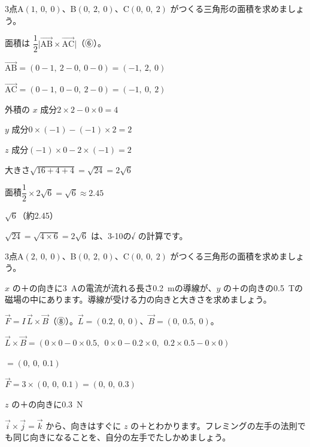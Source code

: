 \begin{reidai}[外積で三角形の面積を求める]
3点A$(1,\ 0,\ 0)$、B$(0,\ 2,\ 0)$、C$(0,\ 0,\ 2)$ がつくる三角形の面積を求めましょう。\par
\kangaekata 面積は $\dfrac{1}{2}\bigl|\overrightarrow{\mathrm{AB}}\times\overrightarrow{\mathrm{AC}}\bigr|$（⑥）。\par
\shiki $\overrightarrow{\mathrm{AB}}=(0-1,\ 2-0,\ 0-0)=(-1,\ 2,\ 0)$\par
\hspace*{2.6\zw}$\overrightarrow{\mathrm{AC}}=(0-1,\ 0-0,\ 2-0)=(-1,\ 0,\ 2)$\par
\hspace*{2.6\zw}外積の $x$ 成分\enspace $2\times2-0\times0=4$\par
\hspace*{2.6\zw}$y$ 成分\enspace $0\times(-1)-(-1)\times2=2$\par
\hspace*{2.6\zw}$z$ 成分\enspace $(-1)\times0-2\times(-1)=2$\par
\hspace*{2.6\zw}大きさ\enspace $\sqrt{16+4+4}=\sqrt{24}=2\sqrt6$\par
\hspace*{2.6\zw}面積\enspace $\dfrac{1}{2}\times2\sqrt6=\sqrt6\approx2.45$\par
\kotae $\sqrt6$（約2.45）
\end{reidai}
$\sqrt{24}=\sqrt{4\times6}=2\sqrt6$ は、3-10の√ の計算です。

\begin{jibun}
3点A$(2,\ 0,\ 0)$、B$(0,\ 2,\ 0)$、C$(0,\ 0,\ 2)$ がつくる三角形の面積を求めましょう。
\end{jibun}

\begin{reidai}[磁場から導線が受ける力]
$x$ の＋の向きに\qty{3}{A}の電流が流れる長さ\qty{0.2}{m}の導線が、$y$ の＋の向きの\qty{0.5}{T}の磁場の中にあります。導線が受ける力の向きと大きさを求めましょう。\par
\kangaekata $\vec F=I\,\vec L\times\vec B$（⑧）。$\vec L=(0.2,\ 0,\ 0)$、$\vec B=(0,\ 0.5,\ 0)$。\par
\shiki $\vec L\times\vec B=(0\times0-0\times0.5,\ \ 0\times0-0.2\times0,\ \ 0.2\times0.5-0\times0)$\par
\hspace*{4.6\zw}$=(0,\ 0,\ 0.1)$\par
\hspace*{2.6\zw}$\vec F=3\times(0,\ 0,\ 0.1)=(0,\ 0,\ 0.3)$\par
\kotae $z$ の＋の向きに\qty{0.3}{N}
\end{reidai}
$\vec i\times\vec j=\vec k$ から、向きはすぐに $z$ の＋とわかります。フレミングの左手の法則でも同じ向きになることを、自分の左手でたしかめましょう。

